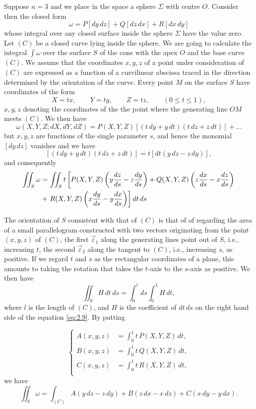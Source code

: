 \documentclass[leqno,11pt]{book}
\numberwithin{equation}{chapter}
\theoremstyle{shape1}
\theoremstyle{shape0}
\theoremstyle{shape2}
\theoremstyle{definition}
\begin{document}
Suppose $n=3$ and we place in the space a sphere $\Sigma$ with centre $O$.  Consider then the closed form
\begin{equation}
  \label{eq:2.8}
  \omega=P[dy\,dz]+Q[dz\,dx]+R[dx\,dy]
\end{equation}
whose integral over any closed surface inside the sphere $\Sigma$ have the value zero. Let $(C)$ be a closed curve lying inside the sphere. We are going to calculate the integral $\int\omega$ over the surface $S$ of the cone with the apex $O$ and the base curve $(C)$. We assume that the coordinates $x,y,z$ of a point under consideration of $(C)$ are expressed as a function of a curvilinear abscissa traced in the direction determined by the orientation of the curve. Every point $M$ on the surface $S$ have coordinates of the form
\[
X=tx,\qquad Y=ty,\qquad Z=tz,\qquad(0\le t\le 1),
\]
$x,y,z$ denoting the coordinates of the the point where the generating line $OM$ meets $(C)$. We then have
\[
\omega(X,Y,Z;dX,dY,dZ)=P(X,Y,Z)[(t\,dy+y\,dt)(t\,dz+z\,dt)]+\dots
\]
but $x,y,z$ are functions of the single parameter $s$, and hence the monomial $[dy\,dz]$ vanishes and we have
\[
[(t\,dy+y\,dt)(t\,dz+z\,dt)]=t[dt(y\,dz-z\,dy)],
\]
and consequently
\begin{align}
  \label{eq:2.9}
  \iint_{S}\omega&=\iint_{S}t\left[P(X,Y,Z)\left(y\frac{dz}{ds}-z\frac{dy}{ds}\right)+Q(X,Y,Z)\left(z\frac{dx}{ds}-x\frac{dz}{ds}\right)\right.\\
&+\left.R(X,Y,Z)\left(x\frac{dy}{ds}-y\frac{dx}{ds}\right)\right]dt\,ds\notag
\end{align}

The orientation of $S$ consistent with that of $(C)$ is that of of regarding  the area of a small parallelogram constructed with two vectors originating from the point $(x,y,z)$ of $(C)$, the first $\vec{\varepsilon}_{1}$ along the generating lines point out of $S$, {i.e.}, increasing $t$, the second $\vec{\varepsilon}_{2}$ along the tangent to $(C)$, {i.e.}, increasing $s$, as positive. If we regard $t$ and $s$ as the rectangular coordinates of a plane, this amounts to taking the rotation that takes the $t$-axis to the $s$-axis as positive. We then have
\[
\iint_{S}H\,dt\,ds=\int_{0}^{l}ds\int_{0}^{1}H\,dt,
\]
where $l$ is the length of $(C)$, and $H$ is the coefficient of $dt\,ds$ on the right hand side of the equation \eqref{eq:2.9}. By putting

\begin{equation}
  \label{eq:2.10}
  \left\{
    \begin{aligned}
      A(x,y,z)&=\int_{0}^{1}t\,P(X,Y,Z)\,dt,\\
      B(x,y,z)&=\int_{0}^{1}t\,Q(X,Y,Z)\,dt,\\
      C(x,y,z)&=\int_{0}^{1}t\,R(X,Y,Z)\,dt,\\
    \end{aligned}
  \right.
\end{equation}
we have
\[
\iint_{S}\omega=\int_{(C)}A(y\,dz-z\,dy)+B(z\,dx-x\,dz)+C(x\,dy-y\,dx).
\]
\end{document}
